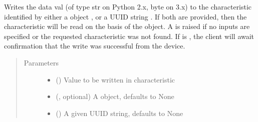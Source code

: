 \documentclass[letterpaper,10pt,english]{sphinxmanual}
\begin{document}
\begin{fulllineitems}
\begin{fulllineitems}
\begin{quote}
\begin{description}
\end{description}\end{quote}

\end{fulllineitems}


\begin{fulllineitems}
\label{\detokenize{PandaBot:PandaBot.PandaBotClient.writeCharacteristic}}
Writes the data val (of type str on Python 2.x, byte on 3.x) to the characteristic identified by either a  object , or a UUID string . If both are provided, then the characteristic will be read on the basis of the  object. A  is raised if no inputs are specified or the requested characteristic was not found. If  is , the client will await confirmation that the write was successful from the device.
\begin{quote}\begin{description}
\item[{Parameters}] \leavevmode\begin{itemize}
\item {} 
 (\sphinxstyleliteralemphasis{\sphinxupquote{, }}) \textendash{} Value to be written in characteristic

\item {} 
 (, optional) \textendash{} A  object, defaults to None

\item {} 
 (\sphinxstyleliteralemphasis{\sphinxupquote{, }}) \textendash{} A given UUID string, defaults to None


\end{itemize}
\end{description}
\end{quote}
\end{fulllineitems}
\end{fulllineitems}
\end{document}
